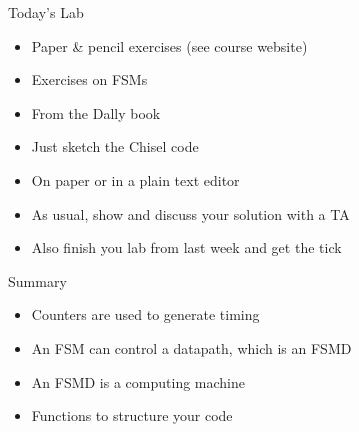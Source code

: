 \begin{frame}[fragile]{Today's Lab}
\begin{itemize}
\item Paper \& pencil exercises (see course website)
\item Exercises on FSMs
\item From the Dally book
\item Just sketch the Chisel code
\item On paper or in a plain text editor
\item As usual, show and discuss your solution with a TA
\item Also finish you lab from last week and get the tick
\end{itemize}
\end{frame}

\begin{frame}[fragile]{Summary}
\begin{itemize}
\item Counters are used to generate timing
\item An FSM can control a datapath, which is an FSMD
\item An FSMD is a computing machine
\item Functions to structure your code
\end{itemize}
\end{frame}




